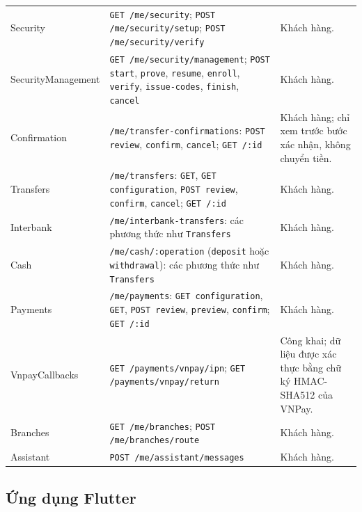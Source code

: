 \begin{longtable}{@{}>{\raggedright\arraybackslash}p{3.3cm}>{\raggedright\arraybackslash}p{6.6cm}>{\raggedright\arraybackslash}p{4.5cm}@{}}
	Security & \texttt{GET /\allowbreak{}me/\allowbreak{}security}; \texttt{POST /\allowbreak{}me/\allowbreak{}security/\allowbreak{}setup}; \texttt{POST /\allowbreak{}me/\allowbreak{}security/\allowbreak{}verify} & Khách hàng.\\
	Security\-Management &\texttt{GET /me/security/\allowbreak management}; \texttt{POST} \texttt{start}, \texttt{prove}, \texttt{resume}, \texttt{enroll}, \texttt{verify}, \texttt{issue-\allowbreak{}codes}, \texttt{finish}, \texttt{cancel} & Khách hàng.\\
	Confirmation & \texttt{/me/transfer-\allowbreak confirmations}: \texttt{POST review}, \texttt{confirm}, \texttt{cancel}; \texttt{GET /\allowbreak{}:id} & Khách hàng; chỉ xem trước bước xác nhận, không chuyển tiền.\\
	Transfers & \texttt{/\allowbreak{}me/\allowbreak{}transfers}: \texttt{GET}, \texttt{GET configuration}, \texttt{POST review}, \texttt{confirm}, \texttt{cancel}; \texttt{GET /\allowbreak{}:id} & Khách hàng.\\
	Interbank & \texttt{/me/interbank-\allowbreak transfers}: các phương thức như \texttt{Transfers} & Khách hàng.\\
	Cash & \texttt{/\allowbreak{}me/\allowbreak{}cash/\allowbreak{}:operation} (\texttt{deposit} hoặc \texttt{withdrawal}): các phương thức như \texttt{Transfers} & Khách hàng.\\
	Payments & \texttt{/\allowbreak{}me/\allowbreak{}payments}: \texttt{GET configuration}, \texttt{GET}, \texttt{POST review}, \texttt{preview}, \texttt{confirm}; \texttt{GET /\allowbreak{}:id} & Khách hàng.\\
	Vnpay\-Callbacks &\texttt{GET /\allowbreak{}payments/\allowbreak{}vnpay/\allowbreak{}ipn}; \texttt{GET /\allowbreak{}payments/\allowbreak{}vnpay/\allowbreak{}return} & Công khai; dữ liệu được xác thực bằng chữ ký HMAC-SHA512 của VNPay.\\
	Branches & \texttt{GET /\allowbreak{}me/\allowbreak{}branches}; \texttt{POST /\allowbreak{}me/\allowbreak{}branches/\allowbreak{}route} & Khách hàng.\\
	Assistant & \texttt{POST /me/assistant/\allowbreak messages} & Khách hàng.\\
\end{longtable}
\endgroup

\subsection{Ứng dụng Flutter}
\label{sec:ch3-flutter}

